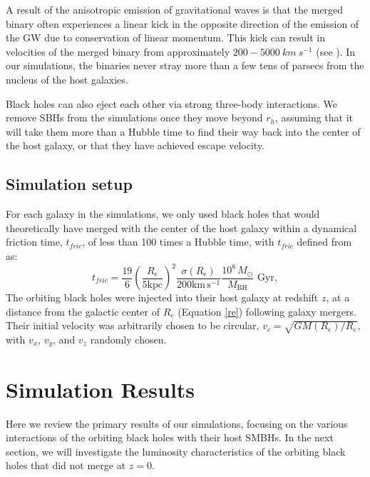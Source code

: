 \documentclass[fleqn,usenatbib,useAMS]{mnras}
\begin{document}
A result of the anisotropic emission of gravitational waves is that the merged binary often experiences a linear kick in the opposite direction of the emission of the GW due to conservation of linear momentum. This kick can result in velocities of the merged binary from approximately $200-5000\ km\ s^{-1}$ (see \citealt{2007PhRvL..98w1101G, 2007PhRvL..98i1101G, 2007PhRvL..98w1102C, 2011PhRvL.107w1102L}).  In our simulations, the binaries never stray more than a few tens of parsecs from the nucleus of the host galaxies.

Black holes can also eject each other via strong three-body interactions. We remove SBHs from the simulations once they move beyond $r_h$, assuming that it will take them more than a Hubble time to find their way back into the center of the host galaxy, or that they have achieved escape velocity.

\subsection{Simulation setup}\label{subsec:simset}
For each galaxy in the simulations, we only used black holes that would theoretically have merged with the center of the host galaxy within a dynamical friction time, $t_{fric}$, of less than 100 times a Hubble time, with $t_{fric}$ defined from \citet{2008gady.book.....B} as:
\begin{equation}\label{tfric}
    t_{fric} = \frac{19}{6}\left(\frac{R_\mathrm{e}}{5\mathrm{kpc}}\right)^2\frac{\sigma(R_\mathrm{e})}{200\mathrm{km}\,\mathrm{s}^{-1}}\frac{10^8\,M_{\odot}}{M_\mathrm{BH}} \text{  Gyr},
\end{equation}
The orbiting black holes were injected into their host galaxy at redshift $z$, at a distance from the galactic center of $R_{e}$ (Equation \ref{re}) following galaxy mergers.  Their initial velocity was arbitrarily chosen to be circular, $v_c = \sqrt{GM(R_e)/R_e}$, with $v_x$, $v_y$, and $v_z$ randomly chosen.

\section{Simulation Results}\label{sec:results}\label{sec:results_overview}
Here we review the primary results of our simulations, focusing on the various interactions of the orbiting black holes with their host SMBHs. In the next section, we will investigate the luminosity characteristics of the orbiting black holes that did not merge at $z=0$.
\end{document}
